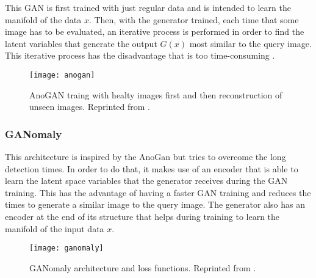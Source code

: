 This GAN is first trained with just regular data and is intended to learn the manifold of the data $x$. Then, with the generator trained, each time that some image has to be evaluated, an iterative process is performed in order to find the latent variables that generate the output \begin{math}G(x)\end{math} most similar to the query image. This iterative process has the disadvantage that is too time-consuming \cite{Schlegl2017}.

\begin{figure}[htb]
  \centering
  \texttt{[image: anogan]}
  \caption[AnoGAN]{AnoGAN traing with healty images first and then reconstruction of unseen images. Reprinted from \cite{Schlegl2017}.}
  \label{fig:anogan}
\end{figure}

\subsubsection{GANomaly}

This architecture is inspired by the AnoGan but tries to overcome the long detection times. In order to do that, it makes use of an encoder that is able to learn the latent space variables that the generator receives during the GAN training. This has the advantage of having a faster GAN training and reduces the times to generate a similar image to the query image. The generator also has an encoder at the end of its structure that helps during training to learn the manifold of the input data $x$.

\begin{figure}[htb]
  \centering
  \texttt{[image: ganomaly]}
  \caption[GANomaly]{GANomaly architecture and loss functions. Reprinted from \cite{DiMattia2019}.}
  \label{fig:ganomaly}
\end{figure}
